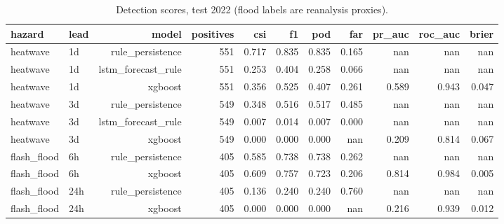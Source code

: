 \begin{table}[t]
\centering
\caption{Detection scores, test 2022 (flood labels are reanalysis proxies).}
\label{tab:det}
\begin{tabular}{llrrrrrrrrr}
\toprule
hazard & lead & model & positives & csi & f1 & pod & far & pr\_auc & roc\_auc & brier \\
\midrule
heatwave & 1d & rule\_persistence & 551 & 0.717 & 0.835 & 0.835 & 0.165 & nan & nan & nan \\
heatwave & 1d & lstm\_forecast\_rule & 551 & 0.253 & 0.404 & 0.258 & 0.066 & nan & nan & nan \\
heatwave & 1d & xgboost & 551 & 0.356 & 0.525 & 0.407 & 0.261 & 0.589 & 0.943 & 0.047 \\
heatwave & 3d & rule\_persistence & 549 & 0.348 & 0.516 & 0.517 & 0.485 & nan & nan & nan \\
heatwave & 3d & lstm\_forecast\_rule & 549 & 0.007 & 0.014 & 0.007 & 0.000 & nan & nan & nan \\
heatwave & 3d & xgboost & 549 & 0.000 & 0.000 & 0.000 & nan & 0.209 & 0.814 & 0.067 \\
flash\_flood & 6h & rule\_persistence & 405 & 0.585 & 0.738 & 0.738 & 0.262 & nan & nan & nan \\
flash\_flood & 6h & xgboost & 405 & 0.609 & 0.757 & 0.723 & 0.206 & 0.814 & 0.984 & 0.005 \\
flash\_flood & 24h & rule\_persistence & 405 & 0.136 & 0.240 & 0.240 & 0.760 & nan & nan & nan \\
flash\_flood & 24h & xgboost & 405 & 0.000 & 0.000 & 0.000 & nan & 0.216 & 0.939 & 0.012 \\
\bottomrule
\end{tabular}
\end{table}